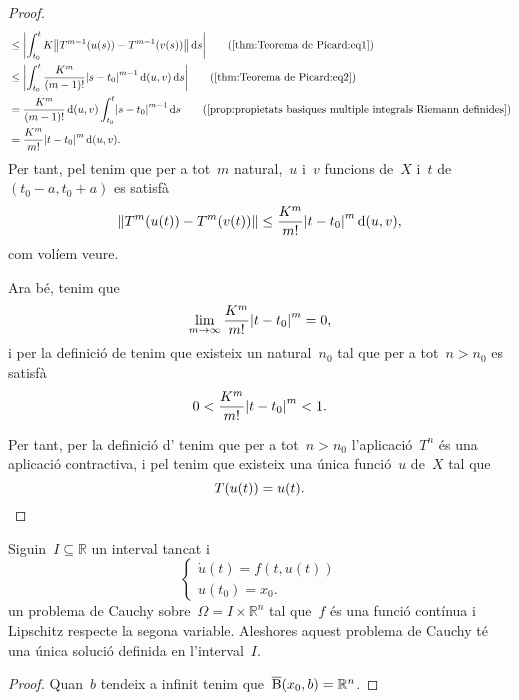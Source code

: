 \documentclass[../../main.tex]{subfiles}
\begin{document}
\begin{proof}
\begin{align*}
            &\leq\abs{\int_{t_{0}}^{t}K\norm{T^{m-1}(u(s))-T^{m-1}(v(s))}\diff s}\tag{\ref{thm:Teorema de Picard:eq1}}\\
            &\leq\abs{\int_{t_{0}}^{t}\frac{K^{m}}{(m-1)!}\abs{s-t_{0}}^{m-1}\distancia(u,v)\diff s}\tag{\ref{thm:Teorema de Picard:eq2}}\\
            &=\frac{K^{m}}{(m-1)!}\distancia(u,v)\int_{t_{0}}^{t}\abs{s-t_{0}}^{m-1}\diff s\tag{\ref{prop:propietats basiques multiple integrals Riemann definides}}\\
            &=\frac{K^{m}}{m!}\abs{t-t_{0}}^{m}\distancia(u,v).%
        \end{align*}
        Per tant, pel  tenim que per a tot~\(m\) natural,~\(u\) i~\(v\) funcions de~\(X\) i~\(t\) de~\((t_{0}-a,t_{0}+a)\) es satisfà
        \[
            \norm{T^{m}(u(t))-T^{m}(v(t))}\leq\frac{K^{m}}{m!}\abs{t-t_{0}}^{m}\distancia(u,v),
        \]
        com volíem veure.

        Ara bé, tenim que
        \[
            \lim_{m\to\infty}\frac{K^{m}}{m!}\abs{t-t_{0}}^{m}=0,
        \]%
        i per la definició de  tenim que existeix un natural~\(n_{0}\) tal que per a tot~\(n>n_{0}\) es satisfà
        \[
            0<{\frac{K^{m}}{m!}\abs{t-t_{0}}^{m}}<1.
        \]

        Per tant, per la definició d' tenim que per a tot~\(n>n_{0}\) l'aplicació~\(T^{n}\) és una aplicació contractiva, i pel \corollari{}  tenim que existeix una única funció~\(u\) de~\(X\) tal que
        \[
            T(u(t))=u(t).\qedhere
        \]
    \end{proof}
    \begin{corollary}
        \label{cor:Teorema de Picard}
        Siguin~\(I\subseteq\mathbb{R}\) un interval tancat i
        \[\begin{cases}
            \displaystyle \dot{u}(t)=f(t,u(t)) \\
            \displaystyle u(t_{0})=x_{0}.
        \end{cases}\]
        un problema de Cauchy sobre~\(\Omega=I\times\mathbb{R}^{n}\) tal que~\(f\) és una funció contínua i Lipschitz respecte la segona variable.
        Aleshores aquest problema de Cauchy té una única solució definida en l'interval~\(I\).
    \end{corollary}
    \begin{proof}
        Quan~\(b\) tendeix a infinit tenim que~\(\overline{\operatorname{B}}(x_{0},b)=\mathbb{R}^{n}\).
    \end{proof}
\end{document}

